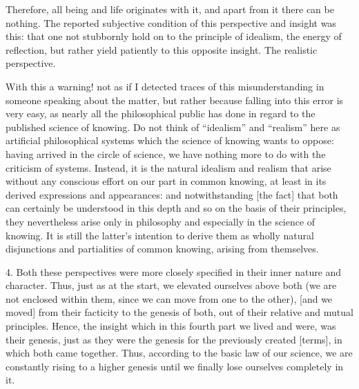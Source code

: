 Therefore, all being and life originates with it,
and apart from it there can be nothing.
The reported subjective condition of
this perspective and insight was this:
that one not stubbornly hold on to
the principle of idealism,
the energy of reflection,
but rather yield patiently
to this opposite insight.
The realistic perspective.

With this a warning!
not as if I detected traces of this misunderstanding
in someone speaking about the matter,
but rather because falling into this error is very easy,
as nearly all the philosophical public has done
in regard to the published science of knowing.
Do not think of “idealism” and “realism”
here as artificial philosophical systems
which the science of knowing wants to oppose:
having arrived in the circle of science,
we have nothing more to do with the criticism of systems.
Instead, it is the natural idealism and realism
that arise without any conscious effort
on our part in common knowing,
at least in its derived expressions and appearances:
and notwithstanding [the fact] that
both can certainly be understood in this depth
and so on the basis of their principles,
they nevertheless arise only in philosophy
and especially in the science of knowing.
It is still the latter’s intention
to derive them as wholly natural disjunctions
and partialities of common knowing,
arising from themselves.

4. Both these perspectives were more closely specified
in their inner nature and character.
Thus, just as at the start,
we elevated ourselves above both
(we are not enclosed within them,
since we can move from one to the other),
[and we moved] from their facticity to the genesis of both,
out of their relative and mutual principles.
Hence, the insight which in this fourth part
we lived and were, was their genesis,
just as they were the genesis
for the previously created [terms],
in which both came together.
Thus, according to the basic law of our science,
we are constantly rising to a higher genesis
until we finally lose ourselves completely in it.

